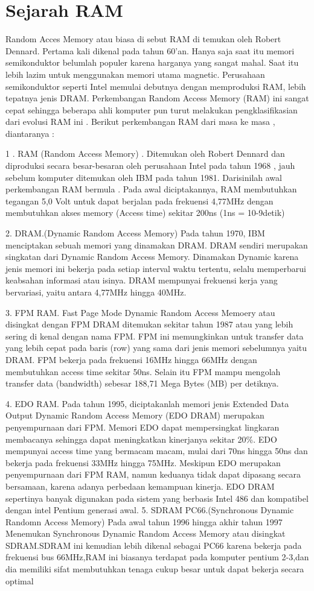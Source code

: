 \section{Sejarah RAM}
Random Acces Memory atau biasa di sebut RAM di temukan oleh Robert Dennard.
Pertama kali dikenal pada tahun 60'an. Hanya saja saat itu memori semikonduktor belumlah populer karena harganya yang sangat mahal. Saat itu lebih lazim untuk menggunakan memori utama magnetic. Perusahaan semikonduktor seperti Intel memulai debutnya dengan memproduksi RAM, lebih tepatnya jenis DRAM.
Perkembangan Random Access Memory (RAM) ini sangat cepat sehingga beberapa ahli komputer pun turut melakukan pengklasifikasian dari evolusi RAM ini . 
Berikut perkembangan RAM dari masa ke masa , diantaranya :

1 . RAM (Random Access Memory) . Ditemukan oleh Robert Dennard dan diproduksi secara besar-besaran oleh perusahaan Intel pada tahun 1968 , 
jauh sebelum komputer ditemukan oleh IBM pada tahun 1981. Darisinilah awal perkembangan RAM bermula . Pada awal diciptakannya, 
RAM membutuhkan tegangan 5,0 Volt untuk dapat berjalan pada frekuensi 4,77MHz dengan membutuhkan akses memory (Access time) sekitar 200ns (1ns = 10-9detik) 

2.	DRAM.(Dynamic Random Access Memory) Pada tahun 1970, IBM menciptakan sebuah memori yang dinamakan DRAM. DRAM sendiri merupakan singkatan dari Dynamic Random Access Memory. Dinamakan Dynamic karena jenis memori ini bekerja pada setiap interval waktu tertentu, selalu memperbarui keabsahan informasi atau isinya. DRAM mempunyai frekuensi kerja yang bervariasi, yaitu antara 4,77MHz hingga 40MHz. 

3.	FPM RAM. Fast Page Mode Dynamic Random Access Memoery atau disingkat dengan FPM DRAM ditemukan sekitar tahun 1987 atau yang lebih sering di kenal dengan nama FPM. FPM ini memungkinkan untuk transfer data yang lebih cepat pada baris (row) yang sama dari jenis memori sebelumnya yaitu DRAM. FPM bekerja pada frekuensi 16MHz hingga 66MHz dengan membutuhkan access time sekitar 50ns. Selain itu FPM mampu mengolah transfer data (bandwidth) sebesar 188,71 Mega Bytes (MB) per detiknya.

4.	EDO RAM. Pada tahun 1995, diciptakanlah memori jenis Extended Data Output Dynamic Random Access Memory (EDO DRAM) merupakan penyempurnaan dari FPM. Memori EDO dapat mempersingkat lingkaran membacanya sehingga dapat meningkatkan kinerjanya sekitar 20\%. EDO mempunyai access time yang bermacam macam, mulai dari 70ns hingga 50ns dan bekerja  pada frekuensi 33MHz hingga 75MHz. Meskipun EDO merupakan penyempurnaan dari FPM RAM, namun keduanya tidak dapat dipasang secara bersamaan, karena adanya perbedaan kemampuan kinerja. EDO DRAM sepertinya banyak digunakan pada sistem yang berbasis Intel 486 dan kompatibel dengan intel Pentium generasi awal.
5.	SDRAM PC66.(Synchronous Dynamic Randomn Access Memory) Pada awal tahun 1996 hingga akhir tahun 1997 Menemukan Synchronous Dynamic Random Access Memory atau disingkat SDRAM.SDRAM ini kemudian lebih dikenal sebagai PC66 karena bekerja pada frekuensi bus 66MHz,RAM ini biasanya terdapat pada komputer pentium 2-3,dan dia memiliki sifat membutuhkan tenaga cukup besar untuk dapat bekerja secara optimal
